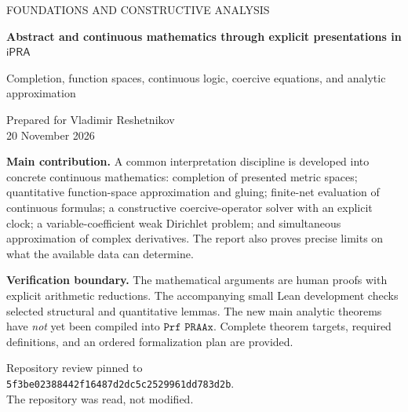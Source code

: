 \documentclass[11pt,oneside]{article}
\newcommand{\ipra}{\ensuremath{\mathsf{iPRA}}}
\theoremstyle{definition}
\theoremstyle{remark}
\begin{document}
\hypersetup{pageanchor=false}
\begin{titlepage}
\vspace*{13mm}
{\color{MidnightBlue}\large FOUNDATIONS AND CONSTRUCTIVE ANALYSIS\par}
\vspace{10mm}
{\raggedright\huge\bfseries Abstract and continuous mathematics through explicit presentations in \(\ipra\)\par}
\vspace{8mm}
{\Large Completion, function spaces, continuous logic, coercive equations, and analytic approximation\par}
\vspace{13mm}
{\large Prepared for Vladimir Reshetnikov\\20 November 2026\par}
\vspace{10mm}
\noindent\textbf{Main contribution.}
A common interpretation discipline is developed into concrete continuous mathematics:
completion of presented metric spaces; quantitative function-space approximation and
gluing; finite-net evaluation of continuous formulas; a constructive coercive-operator
solver with an explicit clock; a variable-coefficient weak Dirichlet problem; and
simultaneous approximation of complex derivatives. The report also proves precise
limits on what the available data can determine.

\vspace{7mm}
\noindent\textbf{Verification boundary.}
The mathematical arguments are human proofs with explicit arithmetic reductions.
The accompanying small Lean development checks selected structural and quantitative
lemmas. The new main analytic theorems have \emph{not} yet been compiled into
\(\texttt{Prf PRAAx}\). Complete theorem targets, required definitions, and an ordered
formalization plan are provided.

\vfill
\noindent Repository review pinned to\\
\texttt{5f3be02388442f16487d2dc5c2529961dd783d2b}.\\[2mm]
The repository was read, not modified.
\end{titlepage}
\hypersetup{pageanchor=true}
\end{document}
